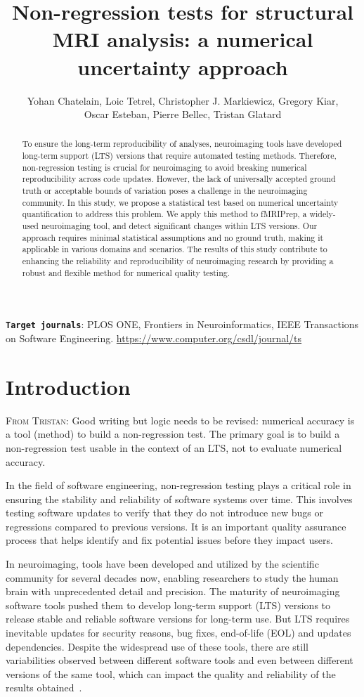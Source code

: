 \documentclass{article}
\title{Non-regression tests for structural MRI analysis: a numerical uncertainty approach}
\author{Yohan Chatelain, Loic Tetrel, Christopher J. Markiewicz, Gregory Kiar,\\ Oscar Esteban,  Pierre Bellec, Tristan Glatard}
\newcommand{\TG}[1]{\color{blue}\textsc{From Tristan:} #1\color{black}\xspace}
\newcommand{\fmriprep}{fMRIPrep\xspace}
\begin{document}
\maketitle

\begin{abstract}
    To ensure the long-term reproducibility of analyses, neuroimaging tools have developed long-term support (LTS) versions that require automated testing methods. Therefore, non-regression testing is crucial for neuroimaging to avoid breaking numerical reproducibility across code updates. However, the lack of universally accepted ground truth or acceptable bounds of variation poses a challenge in the neuroimaging community. In this study, we propose a statistical test based on numerical uncertainty quantification to address this problem. We apply this method to \fmriprep, a widely-used neuroimaging tool, and detect significant changes within LTS versions. Our approach requires minimal statistical assumptions and no ground truth, making it applicable in various domains and scenarios. The results of this study contribute to enhancing the reliability and reproducibility of neuroimaging research by providing a robust and flexible method for numerical quality testing.
\end{abstract}

{
\small
\textbf{\texttt{Target journals}}: PLOS ONE, Frontiers in Neuroinformatics,  IEEE Transactions on
Software Engineering. \url{https://www.computer.org/csdl/journal/ts}
}

\section{Introduction}

\TG{Good writing but logic needs to be revised: numerical accuracy is a tool (method) to build a non-regression test. The primary goal is to build a non-regression test usable in the context of an LTS, not to evaluate numerical accuracy.}

In the field of software engineering, non-regression testing plays a critical role in ensuring the stability and reliability of software systems over time. This involves testing software updates to verify that they do not introduce new bugs or regressions compared to previous versions. It is an important quality assurance process that helps identify and fix potential issues before they impact users.

In neuroimaging, tools have been developed and utilized by the scientific community for several decades now, enabling researchers to study the human brain with unprecedented detail and precision. The maturity of neuroimaging software tools pushed them to develop long-term support (LTS) versions to release stable and reliable software versions for long-term use. But LTS requires inevitable updates for security reasons, bug fixes, end-of-life (EOL) and updates dependencies. Despite the widespread use of these tools, there are still variabilities observed between different software tools and even between different versions of the same tool, which can impact the quality and reliability of the results obtained~\cite{glatard2015reproducibility, bhagwat2021understanding}.
\end{document}
